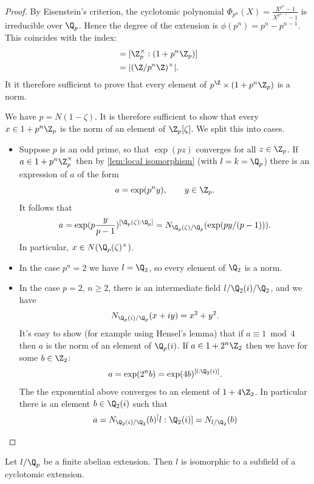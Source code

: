 \begin{proof}
	By Eisenstein's criterion, the cyclotomic polynomial
	$\Phi_{p^n}(X) = \frac{X^{p^n}-1}{X^{p^{n-1}}-1}$ is irreducible over $\Q_p$.
	Hence the degree of the extension is $\phi(p^n)=p^n - p^{n-1}$.
	This coincides with the index:
	\begin{align*}
		[\Q_p^\times : p^\Z \times (1+p^n \Z_p)]
		&= [\Z_p^\times : (1+p^n \Z_p)] \\
		&= | (\Z / p^n \Z)^\times |.
	\end{align*}
	It it therefore sufficient to prove that every element of $p^\Z \times (1+p^n \Z_p)$
	is a norm.

	We have $p = N(1-\zeta)$.
	It is therefore sufficient to show that every $x \in 1 + p^n \Z_p$
	is the norm of an element of $\Z_p[\zeta]$. We split this into cases.
	\begin{itemize}
		\item
		Suppose $p$ is an odd prime, so that $\exp(pz)$ converges for all $z\in \Z_p$.
		If $a \in 1 +p^n\Z_p^\times$ then by \ref{lem:local isomorphism} (with $l=k=\Q_p$)
		there is an expression of $a$ of the form
		\[
			a = \exp(p^n y), \qquad y \in \Z_p.
		\]
		It follows that
		\[
			a= \exp(p\frac{y}{p-1}) ^{[\Q_p(\zeta):\Q_p]}
			= N_{\Q_p(\zeta)/\Q_p}(\exp(py/(p-1))).
		\]
		In particular, $x\in N(\Q_p(\zeta)^\times)$.
		\item
		In the case $p^n = 2$ we have $l = \Q_2$, so every element of $\Q_2$ is a norm.
		\item
		In the case $p=2$, $n \ge 2$, there is an intermediate field $l / \Q_2(i) / \Q_2$,
		and we have
		\[
			N_{\Q_p(i) / \Q_p} (x+i y) = x^2 + y^2.
		\]
		It's easy to show (for example using Hensel's lemma) that if $a \equiv 1 \bmod 4$
		then $a$ is the norm of an element of $\Q_p(i)$.
		If $a \in 1 + 2^n \Z_2$ then we have for some $b \in \Z_2$:
		\[
			a = \exp(2^n b) = \exp(4b)^{[l:\Q_2(i)]}.
		\]
		The the exponential above converges to an element of $1+4\Z_2$.
		In particular there is an element $b \in \Q_2(i)$ such that
		\[
			a = N_{\Q_2(i)/\Q_2} (b) ^ [l:\Q_2(i)]
			= N_{l/\Q_2} (b)
		\]
	\end{itemize}
\end{proof}

\begin{theorem} \label{thm:local Kronecker Weber}
	Let $l/\Q_p$ be a finite abelian extension.
	Then $l$ is isomorphic to a subfield of a cyclotomic extension.
\end{theorem}

